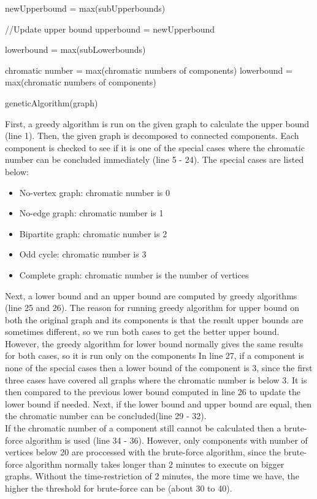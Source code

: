 \documentclass[a4paper]{report}
\begin{document}
		\begin{algorithm}                     
			\begin{algorithmic} [1]     

			\STATE newUpperbound = max(subUpperbounds)
			
			\STATE //Update upper bound
			\STATE upperbound = newUpperbound 
			\ENDIF
			
			\STATE lowerbound = max(subLowerbounds)
			
			\STATE chromatic number = max(chromatic numbers of components)
			\ELSE
			\STATE lowerbound = max(chromatic numbers of components)
			\ENDIF
			
			\STATE geneticAlgorithm(graph)
		\end{algorithmic}
	\end{algorithm}
	First, a greedy algorithm is run on the given graph to calculate the upper bound (line 1). Then, the given graph is decomposed to connected components. Each component is checked to see if it is one of the special cases where the chromatic number can be concluded immediately (line 5 - 24). The special cases are listed below: 
	\begin{itemize}
		\item No-vertex graph: chromatic number is 0
		\item No-edge graph: chromatic number is 1
		\item Bipartite graph: chromatic number is 2
		\item Odd cycle: chromatic number is 3
		\item Complete graph: chromatic number is the number of vertices
	\end{itemize}
	Next, a lower bound and an upper bound are computed by greedy algorithms (line 25 and 26). The reason for running greedy algorithm for upper bound on both the original graph and its components is that the result upper bounds are sometimes different, so we run both cases to get the better upper bound.  However, the greedy algorithm for lower bound normally gives the same results for both cases, so it is run only on the components
	In line 27, if a component is none of the special cases then a lower bound of the component is 3, since the first three cases have covered all graphs where the chromatic number is below 3. It is then compared to the previous lower bound computed in line 26 to update the lower bound if needed. Next, if the lower bound and upper bound are equal, then the chromatic number can be concluded(line 29 - 32). \\
	If the chromatic number of a component still cannot be calculated then a brute-force algorithm is used (line 34 - 36). However, only components with number of vertices below 20 are proccessed with the brute-force algorithm, since the brute-force algorithm normally takes longer than 2 minutes to execute on bigger graphs. Without the time-restriction of 2 minutes, the more time we have, the higher the threshold for brute-force can be (about 30 to 40).\\
	
\end{document}
